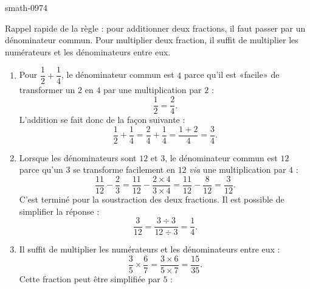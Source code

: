 
\begin{corrige}{smath-0974}

    Rappel rapide de la règle : pour additionner deux fractions, il faut passer par un dénominateur commun. Pour multiplier deux fraction, il suffit de multiplier les numérateurs et les dénominateurs entre eux.
    \begin{enumerate}
        \item
            Pour \( \dfrac{ 1 }{ 2 }+\dfrac{ 1 }{ 4 }\), le dénominateur commun est \( 4\) parce qu'il est «facile» de transformer un \( 2\) en \( 4\) par une multiplication par \( 2\) :
            \begin{equation}
                \frac{ 1 }{2}=\frac{ 2 }{ 4 }.
            \end{equation}
            L'addition se fait donc de la façon suivante :
            \begin{equation}
                \frac{ 1 }{2}+\frac{ 1 }{ 4 }=\frac{ 2 }{ 4 }+\frac{ 1 }{ 4 }=\frac{ 1+2 }{ 4 }=\frac{ 3 }{ 4 }.
            \end{equation}
        \item
            Lorsque les dénominateurs sont \( 12\) et \( 3\), le dénominateur commun est \( 12\) parce qu'un \( 3\) se transforme facilement en \( 12\) \emph{via} une multiplication par \( 4\) :
            \begin{equation}
                \frac{ 11 }{ 12 }-\frac{ 2 }{ 3 }=\frac{ 11 }{ 12 }-\frac{ 2\times 4 }{ 3\times 4 }=\frac{ 11 }{ 12}-\frac{ 8 }{ 12 }=\frac{ 3 }{ 12 }.
            \end{equation}
            C'est terminé pour la soustraction des deux fractions. Il est possible de simplifier la réponse :
            \begin{equation}
                \frac{ 3 }{ 12 }=\frac{ 3\div 3 }{ 12\div 3 }=\frac{1}{ 4 }.
            \end{equation}
        \item
            Il suffit de multiplier les numérateurs et les dénominateurs entre eux :
            \begin{equation}
                \frac{ 3 }{ 5 }\times \frac{ 6 }{ 7 }=\frac{ 3\times 6 }{ 5\times 7 }=\frac{ 15 }{ 35 }.
            \end{equation}
            Cette fraction peut être simplifiée par \( 5\) :

\end{enumerate}
\end{corrige}
